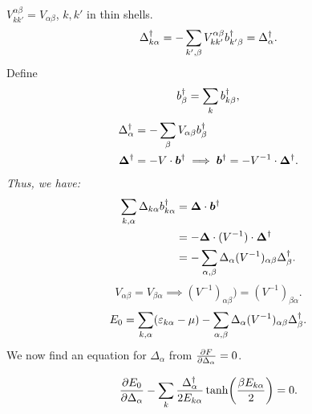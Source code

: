 $V_{kk'}^{\alpha\beta} = V_{\alpha\beta}$, $k,k'$ in thin shells.
\begin{equation}
	\Delta_{k\alpha}^{\dagger} = -\sum_{k',\beta}V_{kk'}^{\alpha\beta}b_{k'\beta}^{\dagger} = \Delta_{\alpha}^{\dagger}.
\end{equation}
Define 
\begin{equation}
	b_{\beta}^{\dagger} = \sum_{k}b_{k\beta}^{\dagger},
\end{equation}
\begin{align}
	\Delta_{\alpha}^{\dagger} &= -\sum_{\beta}V_{\alpha\beta}b_{\beta}^{\dagger} \\
	\bm{\Delta}^{\dagger} &= -{V}\cdot \bm{b}^{\dagger} \implies \bm{b}^{\dagger} = -{V}^{-1}\cdot\bm{\Delta}^{\dagger}.
\end{align}
\emph{Thus, we have:}
\begin{align}
	\sum_{k,\alpha}\Delta_{k\alpha}b_{k\alpha}^{\dagger}&= \bm{\Delta}\cdot\bm{b}^{\dagger}\nonumber \\
	&= - \bm{\Delta}\cdot ({V}^{-1})\cdot \bm{\Delta}^{\dagger} \nonumber \\
	&= -\sum_{\alpha,\beta}\Delta_{\alpha}(V^{-1})_{\alpha\beta}\Delta_{\beta}^{\dagger}.
\end{align}
\begin{equation}
	V_{\alpha\beta} = V_{\beta\alpha} \implies (V^{-1})_{\alpha\beta})=(V^{-1})_{\beta\alpha}.
\end{equation}
\begin{equation}
	E_0 = \sum_{k,\alpha}(\varepsilon_{k\alpha}-\mu)- \sum_{\alpha, \beta}\Delta_{\alpha}(V^{-1})_{\alpha\beta}\Delta_{\beta}^{\dagger}.
\end{equation}
We now find an equation for $\Delta_\alpha$ from $\pdv{F}{\Delta_{\alpha}} = 0$.
\begin{tcolorbox}
	\begin{equation}
		\pdv{E_0}{\Delta_{\alpha}} - \sum_{k}\frac{\Delta_{\alpha}^{\dagger}}{2E_{k\alpha}}\tanh(\frac{\beta E_{k\alpha}}{2}) = 0.
	\end{equation}
\end{tcolorbox}

